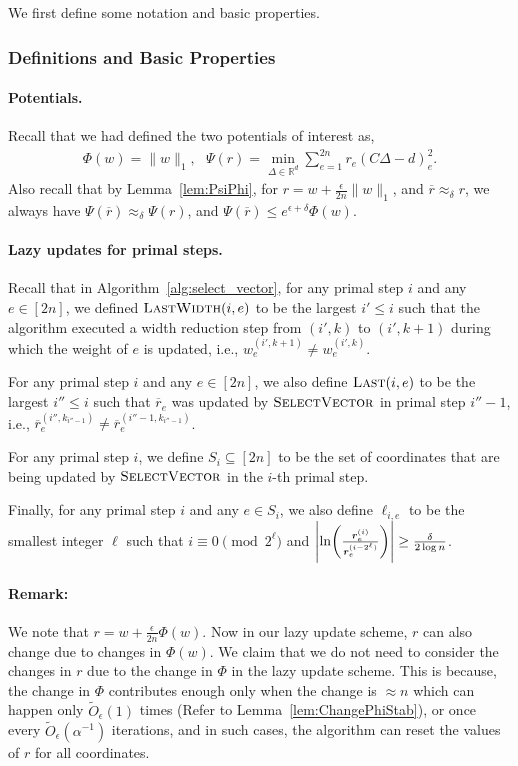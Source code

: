 \documentclass[11pt]{article}
\let\originalleft\left
\let\originalright\right
\renewcommand{\left}{\mathopen{}\mathclose\bgroup\originalleft}
\renewcommand{\right}{\aftergroup\egroup\originalright}
\newcommand\dd{\boldsymbol{\mathit{d}}}
\newcommand\rr{\boldsymbol{\mathit{r}}}
\newcommand\ww{\boldsymbol{\mathit{w}}}
\newcommand\rrbar{\overline{\boldsymbol{\mathit{r}}}}
\newcommand\CC{\boldsymbol{\mathit{C}}}
\newcommand\Otil{\widetilde{O}}
\newcommand{\ov}{\overline}
\newcommand\R{\mathbb{R}}
\begin{document}
We first define some notation and basic properties.
\subsubsection{Definitions and Basic Properties}
\paragraph{Potentials.}
Recall that we had defined the two potentials of interest as, 
\begin{align*}
\Phi(\ww) = \|\ww\|_1, ~~~ \Psi(\rr) = \min_{\Delta\in \R^d }\sum_{e=1}^{2n} \rr_e (\CC\Delta-\dd)^2_e.
\end{align*}
Also recall that by Lemma~\ref{lem:PsiPhi}, for $\rr = \ww + \frac{\epsilon}{2n}\|\ww\|_1$, and $\rrbar\approx_{\delta}\rr$, we always have $\Psi(\rrbar) \approx_{\delta} \Psi(\rr)$, and $\Psi(\rrbar) \leq e^{\epsilon+\delta} \Phi(\ww)$. 




\paragraph{Lazy updates for primal steps.}
Recall that in Algorithm~\ref{alg:select_vector}, for any primal step $i$ and any $e \in [2n]$, we defined $\textsc{LastWidth}(i,e)$ to be the largest $i' \leq i$ such that the algorithm executed a width reduction step from $(i',k)$ to $(i',k+1)$ during which the weight of $e$ is updated, i.e., $\ww_e^{(i',k+1)} \neq \ww_e^{(i',k)}$. 

For any primal step $i$ and any $e \in [2n]$, we also define $\textsc{Last}(i,e)$ to be the largest $i'' \leq i$ such that $\ov{\rr}_e$ was updated by $\textsc{SelectVector}$ in primal step $i''-1$, i.e., $\ov{\rr}_e^{(i'', k_{i''-1})} \neq \ov{\rr}_e^{(i''-1, k_{i''-1})}$.

For any primal step $i$, we define $S_i \subseteq [2n]$ to be the set of coordinates that are being updated by $\textsc{SelectVector}$ in the $i$-th primal step.

Finally, for any primal step $i$ and any $e \in S_i$, we also define $\ell_{i,e}$ to be the smallest integer $\ell$ such that $i \equiv 0 \pmod{2^{\ell}} $ and $\left|\ln\left(\frac{\rr_e^{(i)}}{\rr_e^{(i-2^\ell)}}\right)\right| \geq \frac{\delta}{2 \log n}$. 

\paragraph{Remark:} We note that $\rr = \ww + \frac{\epsilon}{2n}\Phi(\ww)$. Now in our lazy update scheme, $\rr$ can also change due to changes in $\Phi(\ww)$. We claim that we do not need to consider the changes in $\rr$ due to the change in $\Phi$ in the lazy update scheme. This is because, the change in $\Phi$ contributes enough only when the change is $\approx n$ which can happen only $\Otil_{\epsilon}(1)$ times (Refer to Lemma~\ref{lem:ChangePhiStab}), or once every $\Otil_{\epsilon}(\alpha^{-1})$ iterations, and in such cases, the algorithm can reset the values of $\rr$ for all coordinates. 
\end{document}
